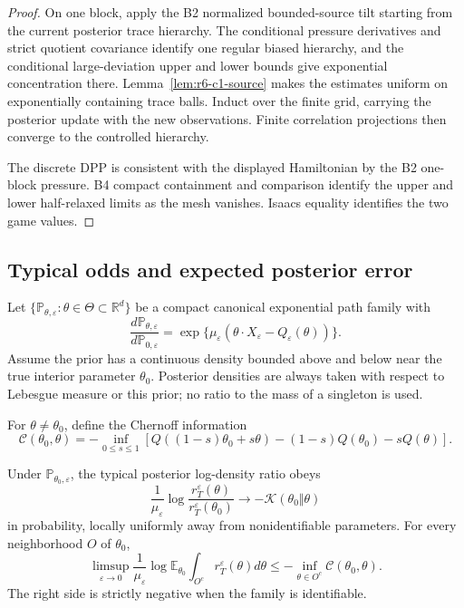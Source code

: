 \begin{proof}
On one block, apply the B2 normalized bounded-source tilt starting from the
current posterior trace hierarchy.  The conditional pressure derivatives and
strict quotient covariance identify one regular biased hierarchy, and the
conditional large-deviation upper and lower bounds give exponential
concentration there.  Lemma~\ref{lem:r6-c1-source} makes the estimates uniform
on exponentially containing trace balls.  Induct over the finite grid,
carrying the posterior update with the new observations.  Finite correlation
projections then converge to the controlled hierarchy.

The discrete DPP is consistent with the displayed Hamiltonian by the B2
one-block pressure.  B4 compact containment and comparison identify the upper
and lower half-relaxed limits as the mesh vanishes.  Isaacs equality identifies
the two game values.
\end{proof}

\subsection{Typical odds and expected posterior error}

Let \(\{\mathbb P_{\theta,\varepsilon}:\theta\in\Theta\subset\mathbb R^d\}\)
be a compact canonical exponential path family with
\[
\frac{d\mathbb P_{\theta,\varepsilon}}
{d\mathbb P_{0,\varepsilon}}
=\exp\{\mu_\varepsilon(\theta\cdot X_\varepsilon-Q_\varepsilon(\theta))\}.
\]
Assume the prior has a continuous density bounded above and below near the
true interior parameter \(\theta_0\).  Posterior densities are always taken
with respect to Lebesgue measure or this prior; no ratio to the mass of a
singleton is used.

For \(\theta\ne\theta_0\), define the Chernoff information
\[
\mathcal C(\theta_0,\theta)=
-\inf_{0\le s\le1}
\left[
Q((1-s)\theta_0+s\theta)
-(1-s)Q(\theta_0)-sQ(\theta)
\right].
\]

\begin{theorem}
\label{thm:r6-c1-testing}
Under \(\mathbb P_{\theta_0,\varepsilon}\), the typical posterior log-density
ratio obeys
\[
\frac1{\mu_\varepsilon}\log
\frac{r_T^\varepsilon(\theta)}{r_T^\varepsilon(\theta_0)}
\longrightarrow
-\mathcal K(\theta_0\Vert\theta)
\]
in probability, locally uniformly away from nonidentifiable parameters.  For
every neighborhood \(O\) of \(\theta_0\),
\[
\limsup_{\varepsilon\to0}
\frac1{\mu_\varepsilon}\log
\mathbb E_{\theta_0}
\int_{O^c}r_T^\varepsilon(\theta)d\theta
\le-\inf_{\theta\in O^c}\mathcal C(\theta_0,\theta).
\]
The right side is strictly negative when the family is identifiable.
\end{theorem}

